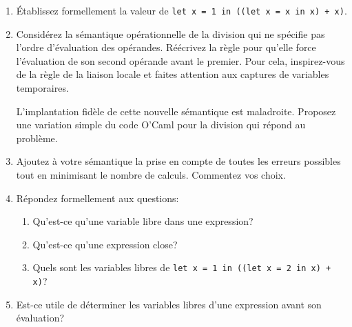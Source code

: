 \documentclass[10pt,a4paper]{article}
\begin{document}
\begin{enumerate}
  \item Établissez formellement la valeur de \texttt{let x = 1 in
  ((let x = x in x) + x)}.

  \item Considérez la sémantique opérationnelle de la division qui ne
  spécifie pas l'ordre d'évaluation des opérandes. Réécrivez la règle
  pour qu'elle force l'évaluation de son second opérande avant le
  premier. Pour cela, inspirez-vous de la règle de la liaison locale
  et faites attention aux captures de variables temporaires.

  L'implantation fidèle de cette nouvelle sémantique est
  maladroite. Proposez une variation simple du code O'Caml pour la
  division qui répond au problème.

  \item Ajoutez à votre sémantique la prise en compte de toutes les
  erreurs possibles tout en minimisant le nombre de calculs. Commentez
  vos choix.

  \item Répondez formellement aux questions:

  \begin{enumerate}

    \item Qu'est-ce qu'une variable libre dans une expression?

    \item Qu'est-ce qu'une expression close?

    \item Quels sont les variables libres de \texttt{let x = 1 in ((let
    x = 2 in x) + x)}?

  \end{enumerate}

  \item Est-ce utile de déterminer les variables libres d'une
  expression avant son évaluation?

\end{enumerate}
\end{document}
